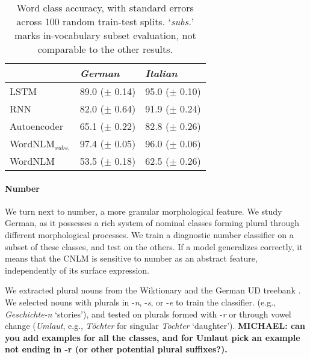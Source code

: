\begin{table}[t]
\footnotesize
    \begin{center}
      \begin{tabular}{l|l|l}
        &\emph{German}&\emph{Italian}\\
        \hline
        LSTM & 89.0 ($\pm$ 0.14) & 95.0 ($\pm$ 0.10) \\
        RNN & 82.0 ($\pm$ 0.64) & 91.9 ($\pm$ 0.24) \\
        Autoencoder & 65.1 ($\pm$ 0.22) & 82.8 ($\pm$ 0.26) \\
	      WordNLM$_{\textit{subs.}}$ & 97.4 ($\pm$ 0.05) & 96.0 ($\pm$ 0.06) \\
	      WordNLM & 53.5 ($\pm$ 0.18)  & 62.5 ($\pm$ 0.26) \\
      \end{tabular}
    \end{center}
	\caption{\label{tab:pos-results} Word class accuracy, with standard errors across 100 random train-test splits. `\emph{subs.}' marks in-vocabulary subset evaluation, not comparable to the other results.} %
\end{table}






\paragraph{Number}
We turn next to number, a more granular morphological feature. We
study German, as it possesses a rich system of nominal classes forming
plural through different morphological processes. We train a diagnostic number
classifier on a subset of these classes, and test on the others. If a
model generalizes correctly, it means that the CNLM is sensitive to number
as an abstract feature, independently of its surface expression.

We extracted plural nouns from the Wiktionary and the German UD
treebank \cite{mcdonald2013universal,brants2002tiger}.  We
selected %
nouns with plurals in -\emph{n}, -\emph{s}, or -\emph{e} to train the
classifier. (e.g., \emph{Geschichte-n} `stories'), and tested on
plurals formed with -\emph{r} or through vowel change (\emph{Umlaut},
e.g., \emph{T{\"o}chter} for singular \emph{Tochter}
`daughter'). \textbf{MICHAEL: can you add examples for all the
  classes, and for Umlaut pick an example not ending in -r (or other
  potential plural suffixes?).}

